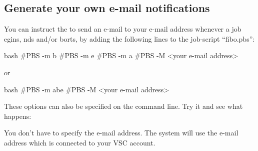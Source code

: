 \subsection{Generate your own e-mail notifications}

You can instruct the \hpc to send an e-mail to your e-mail address whenever a
job egins, nds and/or borts, by adding the
following lines to the job-script ``fibo.pbs'':

\begin{code}{bash}
#PBS -m b
#PBS -m e
#PBS -m a
#PBS -M <your e-mail address>
\end{code}
or
\begin{code}{bash}
#PBS -m abe
#PBS -M <your e-mail address>
\end{code}

These options can also be specified on the command line.  Try it and see what
happens:

\begin{prompt}
\end{prompt}

You don't have to specify the e-mail address. The system will
use the e-mail address which is connected to your VSC account.
